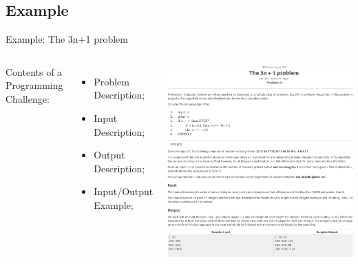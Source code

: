 \subsection{Example}
\begin{frame}{Example: The 3n+1 problem}
  \begin{columns}
      Contents of a Programming Challenge:
      \begin{itemize}
        \item Problem Description;
        \item Input Description;
        \item Output Description;
        \item Input/Output Example;
      \end{itemize}

    \includegraphics[width=1\textwidth]{img/3n_problem}
  \end{columns}
\end{frame}

